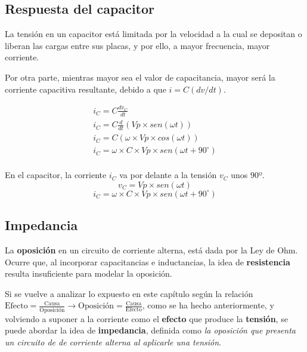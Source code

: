 \subsection{Respuesta del capacitor}

La tensión en un capacitor está limitada por la velocidad a la cual se depositan o liberan las cargas entre sus placas, y por ello, a mayor frecuencia, mayor corriente.

Por otra parte, mientras mayor sea el valor de capacitancia, mayor será la corriente capacitiva resultante, debido a que $i = C(dv/dt)$.

\begin{eqnarray*}
	i_C = C \frac{dv_C}{dt} \\
	i_C = C \frac{d}{dt}(Vp\times sen(\omega t)) \\
	i_C = C (\omega \times Vp \times cos(\omega t)) \\
	i_C = \omega \times C \times Vp \times sen(\omega t + 90^{\circ}) \\
\end{eqnarray*}

\begin{conclusiones}
	En el capacitor, la corriente $i_C$ va por delante a la tensión $v_C$ unos 90º. 
	\begin{equation}
		\label{eq:v_capacitor}
		v_C = Vp\times sen(\omega t)
	\end{equation}
	\begin{equation}
		\label{eq:i_capacitor}
		i_C = \omega \times C \times Vp \times sen(\omega t + 90^{\circ})
	\end{equation}
\end{conclusiones}

\subsection{Impedancia}

La \textbf{oposición} en un circuito de corriente alterna, está dada por la Ley de Ohm. Ocurre que, al incorporar capacitancias e inductancias, la idea de \textbf{resistencia} resulta insuficiente para modelar la oposición.

Si se vuelve a analizar lo expuesto en este capítulo según la relación $\text{Efecto} = \frac{\text{Causa}}{\text{Oposición}} \rightarrow \text{Oposición} = \frac{\text{Causa}}{\text{Efecto}}$, como se ha hecho anteriormente, y volviendo a suponer a la corriente como el \textbf{efecto} que produce la \textbf{tensión}, se puede abordar la idea de \textbf{impedancia}, definida como \textit{la oposición que presenta un circuito de de corriente alterna al aplicarle una tensión}.

